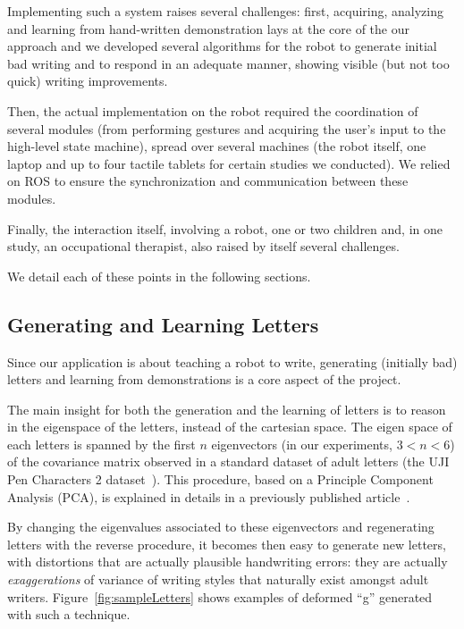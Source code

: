 \documentclass{article}
\begin{document}
Implementing such a system raises several challenges: first, acquiring,
analyzing and learning from hand-written demonstration lays at the core of the
our approach and we developed several algorithms for the robot to generate
initial bad writing and to respond in an adequate manner, showing visible (but
not too quick) writing improvements.

Then, the actual implementation on the robot required the coordination of
several modules (from performing gestures and acquiring the user's input to
the high-level state machine), spread over several machines (the robot itself,
one laptop and up to four tactile tablets for certain studies we conducted). We
relied on ROS to ensure the synchronization and communication between these
modules.

Finally, the interaction itself, involving a robot, one or two children and, in
one study, an occupational therapist, also raised by itself several challenges.

We detail each of these points in the following sections.

\subsection{Generating and Learning Letters}

Since our application is about teaching a robot to write, generating (initially
bad) letters and learning from demonstrations is a core aspect of the project.

The main insight for both the generation and the learning of letters is to
reason in the eigenspace of the letters, instead of the cartesian space. The
eigen space of each letters is spanned by the first $n$ eigenvectors (in our
experiments, $3 < n < 6$) of the covariance matrix observed in a standard
dataset of adult letters (the UJI Pen Characters 2 dataset~\cite{Llorens2008}).
This procedure, based on a Principle Component Analysis (PCA), is explained in
details in a previously published article~\cite{hood2015when}.

By changing the eigenvalues associated to these eigenvectors and regenerating
letters with the reverse procedure, it becomes then easy to generate new
letters, with distortions that are actually plausible handwriting errors: they
are actually \emph{exaggerations} of variance of writing styles that naturally
exist amongst adult writers.  Figure~\ref{fig:sampleLetters} shows examples of
deformed ``g'' generated with such a technique.
\end{document}
